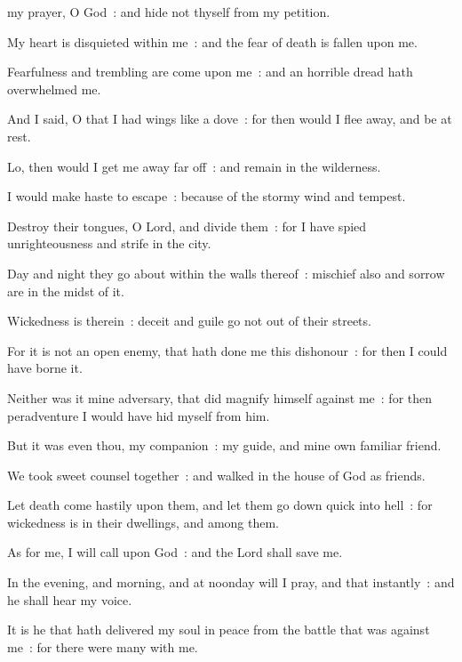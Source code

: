  my prayer, O God~: and hide not thyself from my petition.\par
{}
My heart is disquieted within me~: and the fear of death is fallen upon me.\par
{}Fearfulness and trembling are come upon me~: and an horrible dread hath overwhelmed me.\par
{}And I said, O that I had wings like a dove~: for then would I flee away, and be at rest.\par
{}Lo, then would I get me away far off~: and remain in the wilderness.\par
{}I would make haste to escape~: because of the stormy wind and tempest.\par
{}Destroy their tongues, O Lord, and divide them~: for I have spied unrighteousness and strife in the city.\par
{}Day and night they go about within the walls thereof~: mischief also and sorrow are in the midst of it.\par
{}Wickedness is therein~: deceit and guile go not out of their streets.\par
{}For it is not an open enemy, that hath done me this dishonour~: for then I could have borne it.\par
{}Neither was it mine adversary, that did magnify himself against me~: for then peradventure I would have hid myself from him.\par
{}But it was even thou, my companion~: my guide, and mine own familiar friend.\par
{}We took sweet counsel together~: and walked in the house of God as friends.\par
{}Let death come hastily upon them, and let them go down quick into hell~: for wickedness is in their dwellings, and among them.\par
{}As for me, I will call upon God~: and the Lord shall save me.\par
{}In the evening, and morning, and at noonday will I pray, and that instantly~: and he shall hear my voice.\par
{}It is he that hath delivered my soul in peace from the battle that was against me~: for there were many with me.\par
